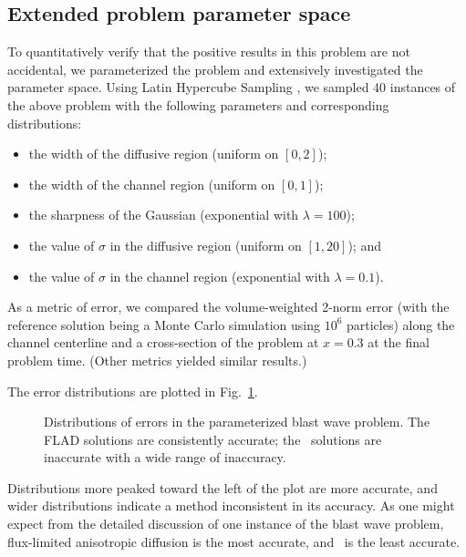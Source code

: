 \subsection{Extended problem parameter space}
To quantitatively verify that the positive results in this problem are not
accidental, we parameterized the problem and extensively investigated the parameter
space.
Using Latin Hypercube Sampling \cite{McK1979}, we sampled 40 instances of
the above problem with the following parameters and corresponding distributions:
\begin{itemize}
  \item the width of the diffusive region (uniform on $[0,2]$);
  \item the width of the channel region (uniform on $[0,1]$);
  \item the sharpness of the Gaussian (exponential with $\lambda = 100$);
  \item the value of $\sigma$ in the diffusive region (uniform on $[1,20]$); and
  \item the value of $\sigma$ in the channel region (exponential with
    $\lambda=0.1$).
\end{itemize}

As a metric of error, we compared the volume-weighted
2-norm error (with the reference solution being a Monte Carlo simulation
using $10^6$ particles) along the channel centerline and a cross-section of the
problem at $x=0.3$ at the final problem time. (Other metrics yielded similar
results.)

The error distributions are plotted in Fig.~\ref{fig:tdBlastwaveParameterized}.
%
\begin{figure}[htb]
  \centering\small

  \caption{Distributions of errors in the parameterized blast wave problem. The
  FLAD solutions are consistently accurate; the \Pone\ solutions are inaccurate
  with a wide range of inaccuracy.}
  \label{fig:tdBlastwaveParameterized}
\end{figure}
%
Distributions more peaked toward the left of the plot are more accurate, and
wider distributions indicate a method inconsistent in its accuracy. As one might
expect from the detailed discussion of one instance of the blast wave problem,
flux-limited anisotropic diffusion is the most accurate, and \Pone\ is the least
accurate.

